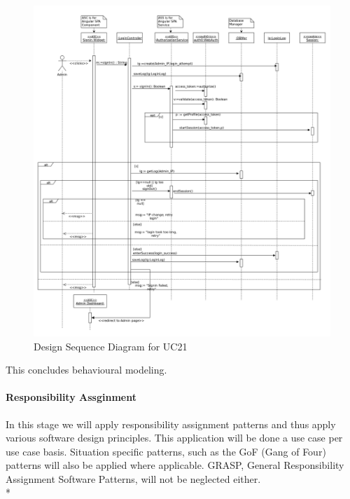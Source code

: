 \documentclass[11pt]{article}
\begin{document}
\begin{figure}[H]
	\centering
	\hspace*{-1.5cm}\includegraphics[width=1.2\textwidth]{../../images/Design_Sequence_Diagram_UC21.png}
	\caption{Design Sequence Diagram for UC21}
\end{figure}

This concludes behavioural modeling.

\paragraph{Responsibility Assginment}

In this stage we will apply responsibility assignment patterns and thus apply various software design principles. This application will be done a use case per use case basis. Situation specific patterns, such as the GoF (Gang of Four) patterns will also be applied where applicable. GRASP, General Responsibility Assignment Software Patterns, \cite{Book:1} will not be neglected either.\\*
\end{document}
